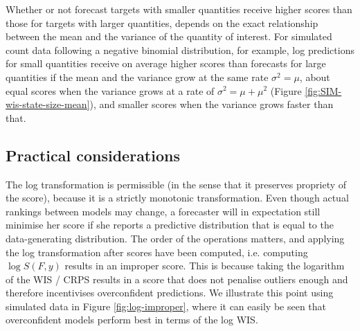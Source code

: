 \documentclass{article}
\begin{document}
Whether or not forecast targets with smaller quantities receive higher scores than those for targets with larger quantities, depends on the exact relationship between the mean and the variance of the quantity of interest. For simulated count data following a negative binomial distribution, for example, log predictions for small quantities receive on average higher scores than forecasts for large quantities if the mean and the variance grow at the same rate $\sigma^2 = \mu$, about equal scores when the variance grows at a rate of $\sigma^2 = \mu + \mu^2$ (Figure \ref{fig:SIM-wis-state-size-mean}), and smaller scores when the variance grows faster than that. 

\subsection{Practical considerations}

The log transformation is permissible (in the sense that it preserves propriety of the score), because it is a strictly monotonic transformation. Even though actual rankings between models may change, a forecaster will in expectation still minimise her score if she reports a predictive distribution that is equal to the data-generating distribution. The order of the operations matters, and applying the log transformation after scores have been computed, i.e. computing $\log S(F, y)$ results in an improper score. This is because taking the logarithm of the WIS / CRPS results in a score that does not penalise outliers enough and therefore incentivises overconfident predictions. We illustrate this point using simulated data in Figure \ref{fig:log-improper}, where it can easily be seen that overconfident models perform best in terms of the log WIS. 
\end{document}
